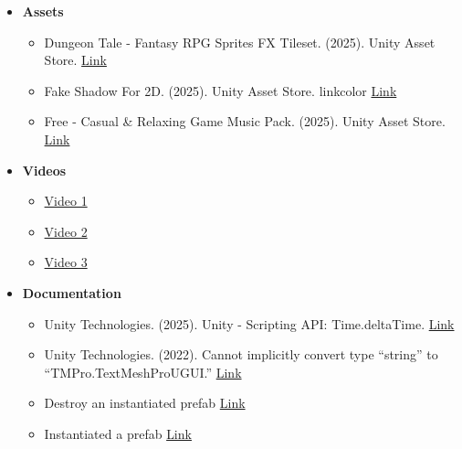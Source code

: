 \documentclass[11pt]{article}
\begin{document}
  \begin{itemize}
    \item \textbf{Assets}
    \begin{itemize}
      \item Dungeon Tale - Fantasy RPG Sprites FX Tileset. (2025). Unity Asset Store. \href{https://assetstore.unity.com/packages/2d/environments/dungeon-tale-fantasy-rpg-sprites-fx-tileset-296458}{Link}
      \item Fake Shadow For 2D. (2025). Unity Asset Store. linkcolor \href{https://assetstore.unity.com/packages/2d/textures-materials/fake-shadow-for-2d-281626}{Link}
      \item Free - Casual \& Relaxing Game Music Pack. (2025). Unity Asset Store. \href{https://assetstore.unity.com/packages/audio/music/free-casual-relaxing-game-music-pack-262740}{Link}
    \end{itemize}
    
    \item \textbf{Videos}
    \begin{itemize}
      \item \href{https://www.youtube.com/watch?v=YNJM7rWbbxY}{Video 1}
      \item \href{https://www.youtube.com/watch?v=_YgeNG6MtQQ&t=3s}{Video 2}
      \item \href{https://www.youtube.com/watch?v=QQ3Yub9So2k&t=184s}{Video 3}
    \end{itemize}

    \item \textbf{Documentation}
    \begin{itemize}
      \item Unity Technologies. (2025). Unity - Scripting API: Time.deltaTime. \href{https://docs.unity3d.com/6000.0/Documentation/ScriptReference/Time-deltaTime.html}{Link}
      \item Unity Technologies. (2022). Cannot implicitly convert type “string” to “TMPro.TextMeshProUGUI.” \href{https://discussions.unity.com/t/cannot-implicitly-convert-type-string-to-tmpro-textmeshprougui/884511}{Link}
      \item Destroy an instantiated prefab \href{https://stackoverflow.com/questions/68317810/how-can-i-destroy-a-prefab-i-instantiated-unity}{Link}
      \item Instantiated a prefab \href{https://docs.unity3d.com/es/2019.4/Manual/InstantiatingPrefabs.html}{Link}
    \end{itemize}
    
  \end{itemize}
\end{document}
